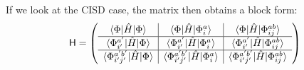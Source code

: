 \documentclass{report}
\theoremstyle{plain}
\theoremstyle{definition}
\begin{document}
If we look at the CISD case, the matrix then obtains a block form:
\begin{equation}
  \mathsf{H} = \left(\begin{array}{c|c|c} 
      \braket{\Phi|\hat{H}|\Phi} &
    \braket{\Phi|\hat{H}|\Phi_i^a} &
    \braket{\Phi|\hat{H}|\Phi_{ij}^{ab}} \\ \hline
    \braket{\Phi_{i'}^{a'}|\hat{H}|\Phi} &
    \braket{\Phi_{i'}^{a'}|\hat{H}|\Phi_{i}^a} &
    \braket{\Phi_{i'}^{a'}|\hat{H}|\Phi_{ij}^{ab}} \\ \hline 
    \braket{\Phi_{i'j'}^{a'b'}|\hat{H}|\Phi} &
    \braket{\Phi_{i'j'}^{a'b'}|\hat{H}|\Phi_{i}^a} &
    \braket{\Phi_{i'j'}^{a'b'}|\hat{H}|\Phi_{ij}^{ab}}
  \end{array}\right)
\end{equation}



\end{document}
